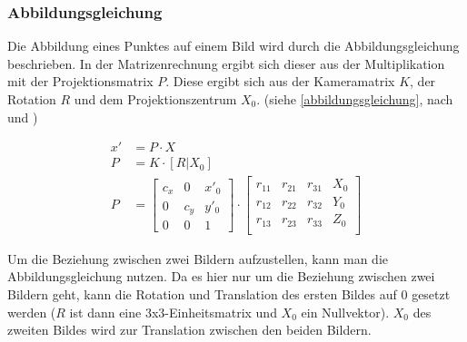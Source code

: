\documentclass[./00PhotoBox.tex]{subfiles}
\begin{document}

\subsubsection{Abbildungsgleichung}
\label{ss:abbildungsgleichung}
Die Abbildung eines Punktes auf einem Bild wird durch die Abbildungsgleichung beschrieben. In der Matrizenrechnung ergibt sich dieser aus der Multiplikation mit der Projektionsmatrix $P$. Diese ergibt sich aus der Kameramatrix $K$, der Rotation $R$ und dem Projektionszentrum $X_0$. (siehe \autoref{abbildungsgleichung}, nach \citealp[S. 244]{hartley} und \citealp[S. 288]{luhmann4})

\begin{align}
    \label{abbildungsgleichung}
    x' & = P \cdot X       \\
    P  & = K \cdot [R|X_0] \\
    P  & =
    \begin{bmatrix}
        c_x & 0   & x'_0 \\
        0   & c_y & y'_0 \\
        0   & 0   & 1
    \end{bmatrix}
    \cdot
    \begin{bmatrix}
        r_11 & r_21 & r_31 & X_0 \\
        r_12 & r_22 & r_32 & Y_0 \\
        r_13 & r_23 & r_33 & Z_0 \\
    \end{bmatrix}
\end{align}

Um die Beziehung zwischen zwei Bildern aufzustellen, kann man die Abbildungsgleichung nutzen. Da es hier nur um die Beziehung zwischen zwei Bildern geht, kann die Rotation und Translation des ersten Bildes auf 0 gesetzt werden ($R$ ist dann eine 3x3-Einheitsmatrix und $X_0$ ein Nullvektor). $X_0$ des zweiten Bildes wird zur Translation zwischen den beiden Bildern. \citep[S. 326]{luhmann4}
\end{document}
